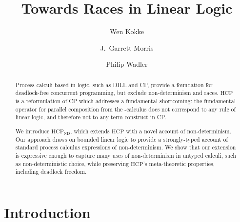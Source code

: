 \documentclass{lmcs}
\providecommand{\hcp}{\ensuremath{\text{HCP}}\xspace}
\providecommand{\nodcap}{\ensuremath{\hcp_{\text{ND}}}\xspace}
\providecommand{\piDILL}{\textpi DILL\xspace}
\begin{document}
\title{Towards Races in Linear Logic}

\author[W.~Kokke]{Wen Kokke}
\address{University of Edinburgh, Edinburgh, UK}

\author[G.~Morris]{J.\ Garrett Morris}
\address{University of Kansas, Lawrence, KS, USA}

\author[P.~Wadler]{Philip Wadler}
\address{University of Edinburgh, Edinburgh, UK}

\begin{abstract}
  Process calculi based in logic, such as \piDILL and CP, provide a foundation for deadlock-free concurrent programming, but exclude non-determinism and races. \hcp is a reformulation of CP which addresses a fundamental shortcoming: the fundamental operator for parallel composition from the \textpi-calculus does not correspond to any rule of linear logic, and therefore not to any term construct in CP.

  We introduce \nodcap, which extends \hcp with a novel account of non-determinism. Our approach draws on bounded linear logic to provide a strongly-typed account of standard process calculus expressions of non-determinism. We show that our extension is expressive enough to capture many uses of non-determinism in untyped calculi, such as non-deterministic choice, while preserving \hcp's meta-theoretic properties, including deadlock freedom.  
\end{abstract}

\maketitle

\section{Introduction}\label{sec:introduction}
\end{document}
